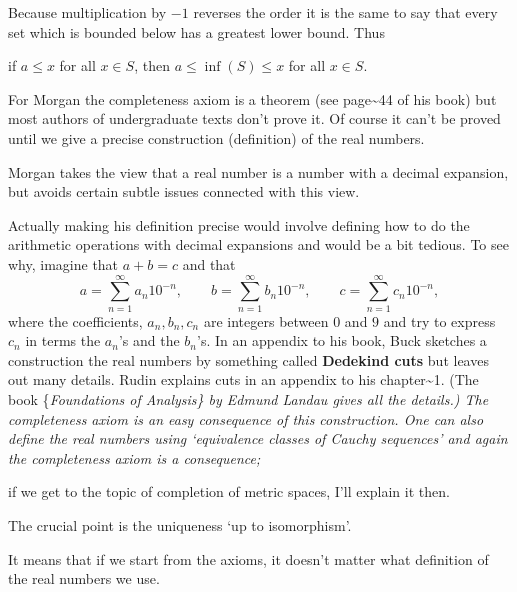 \documentclass[10pt,a4paper,UTF8]{article}
\begin{document}
Because multiplication by \(-1\) reverses the order it is the same to say that every set which is bounded below has a greatest lower bound. Thus

if \(a\le x\) for all \(x\in S\), then
\(a\le \inf(S)\le x\) for all \(x\in S\).

For Morgan the completeness axiom is a theorem (see page\textasciitilde{}44 of his book)
but most authors of undergraduate texts don't prove it.
Of course it can't be proved until we give a precise construction (definition)
of the real numbers.

Morgan takes the view that a real number is a number with
a decimal expansion, but avoids certain subtle issues connected
with this view.

Actually making his definition precise would involve defining how to do
the arithmetic operations with decimal expansions and would be
a bit tedious.  To see why, imagine that \(a+b=c\) and that
$$
  a=\sum_{n=1}^\infty a_n10^{-n},\qquad
  b=\sum_{n=1}^\infty b_n10^{-n},\qquad
  c=\sum_{n=1}^\infty c_n10^{-n},
$$
where the coefficients, \(a_n,b_n,c_n\) are integers between \(0\) and \(9\)
and try to express \(c_n\) in terms the \(a_n\)'s and the \(b_n\)'s.
In an appendix to his book, Buck sketches a construction the real numbers
by something called \textbf{Dedekind cuts}   but leaves out many details.
Rudin explains cuts in an appendix to his chapter\textasciitilde{}1.
(The book \{\em Foundations of Analysis\} by Edmund Landau gives all the details.)
The completeness axiom is an easy consequence of this construction.
One can also define the real numbers using `equivalence classes of Cauchy sequences'
 and again the completeness axiom is a consequence;

if we get to the topic of completion of metric spaces, I'll explain it then.

The crucial point is the uniqueness `up to isomorphism'.

It means that if we start from  the axioms, it doesn't matter what
definition of the real numbers we use.
\end{document}
